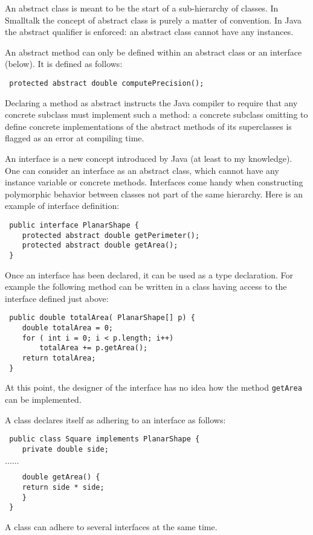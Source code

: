 \documentclass[twoside]{book}
\begin{document}
An abstract class is meant to be the start of a sub-hierarchy of
classes. In Smalltalk the concept of abstract class is purely a
matter of convention. In Java the abstract qualifier is enforced:
an abstract class cannot have any instances.

An abstract method can only be defined within an abstract class or
an interface (\cf below). It is defined as follows:
\begin{verbatim}
 protected abstract double computePrecision();
\end{verbatim}
Declaring a method as abstract instructs the Java compiler to
require that any concrete subclass must implement such a method: a
concrete subclass omitting to define concrete implementations of
the abstract methods of its superclasses is flagged as an error at
compiling time.

An interface is a new concept introduced by Java (at least to my
knowledge). One can consider an interface as an abstract class,
which cannot have any instance variable or concrete methods.
Interfaces come handy when constructing polymorphic behavior
between classes not part of the same hierarchy. Here is an example
of interface definition:
\begin{verbatim}
 public interface PlanarShape {
    protected abstract double getPerimeter();
    protected abstract double getArea();
 }
\end{verbatim}
Once an interface has been declared, it can be used as a type
declaration. For example the following method can be written in a
class having access to the interface defined just above:
\begin{verbatim}
 public double totalArea( PlanarShape[] p) {
    double totalArea = 0;
    for ( int i = 0; i < p.length; i++)
        totalArea += p.getArea();
    return totalArea;
 }
\end{verbatim}
At this point, the designer of the interface has no idea how the
method {\tt getArea} can be implemented.

\noindent A class declares itself as adhering to an interface as
follows:
\begin{verbatim}
 public class Square implements PlanarShape {
    private double side;
\end{verbatim}
$\ldots\ldots$
\begin{verbatim}
    double getArea() {
    return side * side;
    }
 }
\end{verbatim}
A class can adhere to several interfaces at the same time.
\end{document}
